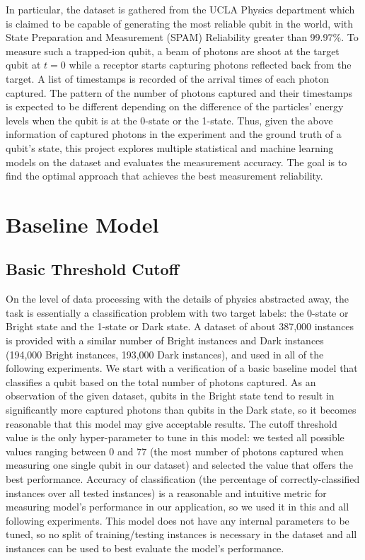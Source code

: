 \documentclass[letterpaper,twocolumn,10pt]{article}
\begin{document}
In particular, the dataset is gathered from the UCLA Physics department which is claimed to be capable of generating the most reliable qubit in the world, with State Preparation and Measurement (SPAM) Reliability greater than 99.97\%. To measure such a trapped-ion qubit, a beam of photons are shoot at the target qubit at $t = 0$ while a receptor starts capturing photons reflected back from the target. A list of timestamps is recorded of the arrival times of each photon captured. The pattern of the number of photons captured and their timestamps is expected to be different depending on the difference of the particles' energy levels when the qubit is at the 0-state or the 1-state. Thus, given the above information of captured photons in the experiment and the ground truth of a qubit's state, this project explores multiple statistical and machine learning models on the dataset and evaluates the measurement accuracy. The goal is to find the optimal approach that achieves the best measurement reliability. 

\section{Baseline Model}

\subsection{Basic Threshold Cutoff}

On the level of data processing with the details of physics abstracted away, the task is essentially a classification problem with two target labels: the 0-state or Bright state and the 1-state or Dark state. A dataset of about 387,000 instances is provided with a similar number of Bright instances and Dark instances (194,000 Bright instances, 193,000 Dark instances), and used in all of the following experiments. We start with a verification of a basic baseline model that classifies a qubit based on the total number of photons captured. As an observation of the given dataset, qubits in the Bright state tend to result in significantly more captured photons than qubits in the Dark state, so it becomes reasonable that this model may give acceptable results. The cutoff threshold value is the only hyper-parameter to tune in this model: we tested all possible values ranging between 0 and 77 (the most number of photons captured when measuring one single qubit in our dataset) and selected the value that offers the best performance. Accuracy of classification (the percentage of correctly-classified instances over all tested instances) is a reasonable and intuitive metric for measuring model's performance in our application, so we used it in this and all following experiments. This model does not have any internal parameters to be tuned, so no split of training/testing instances is necessary in the dataset and all instances can be used to best evaluate the model's performance.
\end{document}
